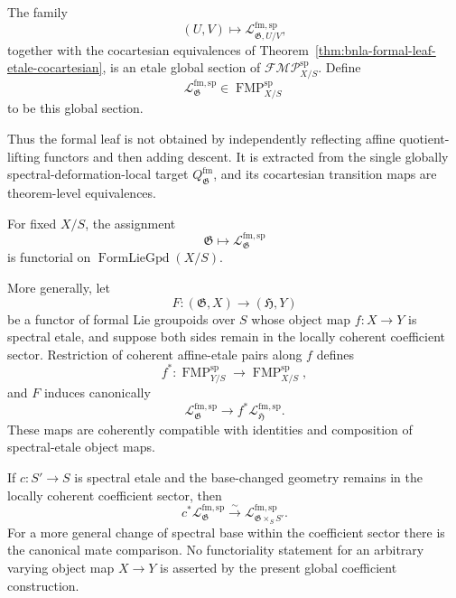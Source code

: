 \begin{definition}
\label{def:bnla-global-spectral-leaf-envelope}
The family
\[
    (U,V)\longmapsto
    \mathcal L^{\mathrm{fm,sp}}_{\mathfrak G,U/V},
\]
together with the cocartesian equivalences of
Theorem~\ref{thm:bnla-formal-leaf-etale-cocartesian}, is an etale global
section of $\mathscr{FMP}^{\mathrm{sp}}_{X/S}$.  Define
\[
\boxed{
    \mathcal L^{\mathrm{fm,sp}}_{\mathfrak G}
    \in
    \operatorname{FMP}^{\mathrm{sp}}_{X/S}}
\]
to be this global section.
\end{definition}

Thus the formal leaf is not obtained by independently reflecting affine
quotient-lifting functors and then adding descent.  It is extracted from the
single globally spectral-deformation-local target
$Q^{\mathrm{fm}}_{\mathfrak G}$, and its cocartesian transition maps are
theorem-level equivalences.

\begin{theorem}
\label{thm:bnla-global-leaf-functoriality}
For fixed $X/S$, the assignment
\[
    \mathfrak G
    \longmapsto
    \mathcal L^{\mathrm{fm,sp}}_{\mathfrak G}
\]
is functorial on $\operatorname{FormLieGpd}(X/S)$.

More generally, let
\[
    F:(\mathfrak G,X)\longrightarrow(\mathfrak H,Y)
\]
be a functor of formal Lie groupoids over $S$ whose object map
$f:X\to Y$ is spectral etale, and suppose both sides remain in the locally
coherent coefficient sector.  Restriction of coherent affine-etale pairs
along $f$ defines
\[
    f^*:
    \operatorname{FMP}^{\mathrm{sp}}_{Y/S}
    \longrightarrow
    \operatorname{FMP}^{\mathrm{sp}}_{X/S},
\]
and $F$ induces canonically
\[
\boxed{
    \mathcal L^{\mathrm{fm,sp}}_{\mathfrak G}
    \longrightarrow
    f^*\mathcal L^{\mathrm{fm,sp}}_{\mathfrak H}.}
\]
These maps are coherently compatible with identities and composition of
spectral-etale object maps.

If $c:S'\to S$ is spectral etale and the base-changed geometry remains in the
locally coherent coefficient sector, then
\[
\boxed{
    c^*
    \mathcal L^{\mathrm{fm,sp}}_{\mathfrak G}
    \xrightarrow{\sim}
    \mathcal L^{\mathrm{fm,sp}}_{\mathfrak G\times_SS'}.}
\]
For a more general change of spectral base within the coefficient sector there
is the canonical mate comparison.  No functoriality statement for an
arbitrary varying object map $X\to Y$ is asserted by the present global
coefficient construction.
\end{theorem}

